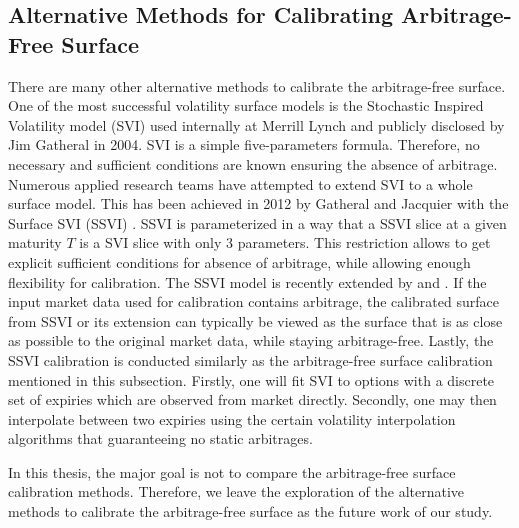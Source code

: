 \documentclass[letterpaper,12pt,titlepage,oneside,final]{book}
\numberwithin{equation}{section}
\theoremstyle{definition}
\begin{document}
\subsection{Alternative Methods for Calibrating Arbitrage-Free Surface}
There are many other alternative methods to calibrate the arbitrage-free surface. One of the most successful volatility surface models is the Stochastic Inspired Volatility model (SVI) \cite{gatheral2004parsimonious} used internally at Merrill Lynch and publicly disclosed by Jim Gatheral in 2004.  SVI is a simple  five-parameters formula. Therefore, no necessary and sufficient conditions are known ensuring the absence of arbitrage. Numerous applied research teams have attempted to extend SVI to a whole surface model. This has been achieved in 2012 by Gatheral and Jacquier with the Surface SVI (SSVI) \cite{gatheral2014arbitrage}. SSVI is parameterized in a way that a  SSVI slice at a given maturity $T$ is a SVI slice with only 3 parameters. This restriction allows to get explicit sufficient conditions for absence of arbitrage, while allowing enough flexibility for calibration. The SSVI model is recently extended by \cite{hendriks2017extended} and \cite{corbetta2019robust}. If the input market data used for calibration contains arbitrage, the calibrated surface from SSVI \cite{gatheral2014arbitrage} or its extension can typically be viewed as the surface that is as close as possible to the original market data, while staying arbitrage-free. Lastly, the SSVI calibration is conducted similarly as the arbitrage-free surface calibration mentioned in this subsection.  Firstly, one will fit SVI to options with a discrete set of expiries which are observed from market directly. Secondly, one may then interpolate between two expiries using the certain volatility interpolation algorithms that   guaranteeing no static arbitrages. 

In this thesis, the major goal is not to compare the arbitrage-free surface calibration methods. Therefore, we leave the exploration of the alternative methods to calibrate the arbitrage-free surface as the future work of our study. 
\end{document}
